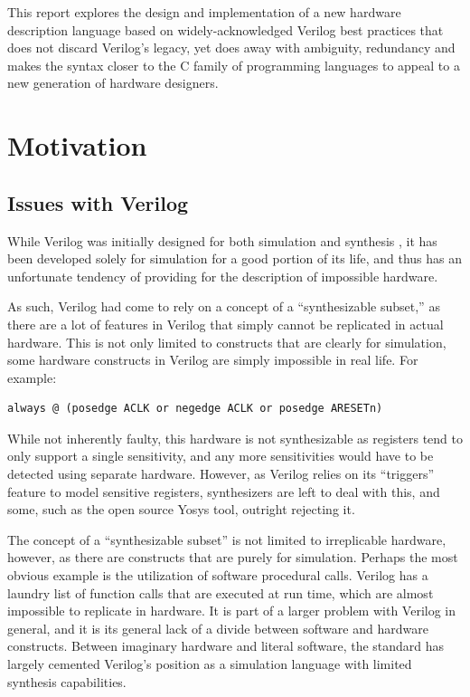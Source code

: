 \documentclass[10pt, two column]{article}
\theoremstyle{definition}
\begin{document}
This report explores the design and implementation of a new hardware description language based on widely-acknowledged Verilog best practices that does not discard Verilog’s legacy, yet does away with ambiguity, redundancy and makes the syntax closer to the C family of programming languages to appeal to a new generation of hardware designers.

\section{Motivation}
\subsection{Issues with Verilog}
While Verilog was initially designed for both simulation and synthesis \cite{threeDecadesofHDL}, it has been developed solely for simulation for a good portion of its life, and thus has an unfortunate tendency of providing for the description of impossible hardware.\par

As such, Verilog had come to rely on a concept of a “synthesizable subset,”\cite{synthesizableSubset_2017} as there are a lot of features in Verilog that simply cannot be replicated in actual hardware. This is not only limited to constructs that are clearly for simulation, some hardware constructs in Verilog are simply impossible in real life. For example: 
\begin{lstlisting}
always @ (posedge ACLK or negedge ACLK or posedge ARESETn)
\end{lstlisting}

While not inherently faulty, this hardware is not synthesizable as registers tend to only support a single sensitivity, and any more sensitivities would have to be detected using separate hardware. However, as Verilog relies on its “triggers” feature to model sensitive registers, synthesizers are left to deal with this, and some, such as the open source Yosys tool, outright rejecting it.\par

The concept of a “synthesizable subset” is not limited to irreplicable hardware, however, as there are constructs that are purely for simulation. Perhaps the most obvious example is the utilization of software procedural calls. Verilog has a laundry list of function calls that are executed at run time, which are almost impossible to replicate in hardware. It is part of a larger problem with Verilog in general, and it is its general lack of a divide between software and hardware constructs. Between imaginary hardware and literal software, the standard has largely cemented Verilog’s position as a simulation language with limited synthesis capabilities.\par
\end{document}
